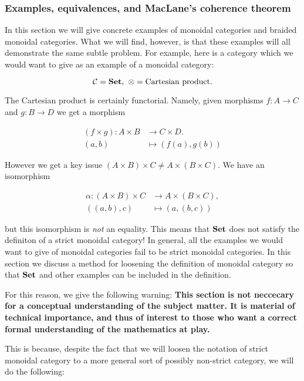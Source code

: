 \subsubsection{Examples, equivalences, and MacLane's coherence theorem}

In this section we will give concrete examples of monoidal categories and braided monoidal categories. What we will find, however, is that these examples will all demonstrate the same subtle problem. For example, here is a category which we would want to give as an example of a monoidal category:

$${\mathcal C}={\bf Set},\,\, \otimes = \text{Cartesian product}.$$

The Cartesian product is certainly functorial. Namely, given morphisms $f:A\to C$ and $g:B\to D$ we get a morphism

\begin{align*}
(f\times g): A\times B &\xrightarrow{} C\times D.\\
(a,b)&\mapsto (f(a), g(b))
\end{align*}

However we get a key issue $(A\times B)\times C \neq A\times (B\times C)$. We have an isomorphism

\begin{align*}
\alpha : (A\times B )\times C &\xrightarrow{} A \times (B\times C),\\
((a,b),c)&\mapsto (a,(b,c))
\end{align*}

but this isomorphism is {\em not} an equality. This means that ${\bf Set}$ does not satisfy the definiton of a strict monoidal category! In general, all the examples we would want to give of monoidal categories fail to be strict monoidal categories. In this section we discuss a method for loosening the definition of monoidal category so that ${\bf Set}$ and other examples can be included in the definition.

For this reason, we give the following warning: \textbf{This section is not neccecary for a conceptual understanding of the subject matter. It is material of technical importance, and thus of interest to those who want a correct formal understanding of the mathematics at play.}

This is because, despite the fact that we will loosen the notation of strict monoidal category to a more general sort of possibly non-strict category, we will do the following:

\begin{center}
\end{center}

